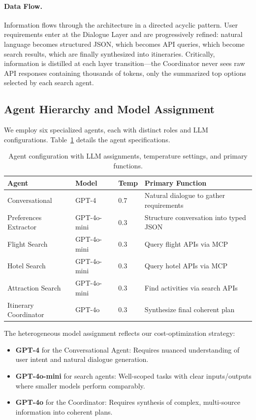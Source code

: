 \documentclass[preprint,review,12pt]{elsarticle}
\begin{document}
\paragraph{Data Flow.} Information flows through the architecture in a directed acyclic pattern. User requirements enter at the Dialogue Layer and are progressively refined: natural language becomes structured JSON, which becomes API queries, which become search results, which are finally synthesized into itineraries. Critically, information is distilled at each layer transition---the Coordinator never sees raw API responses containing thousands of tokens, only the summarized top options selected by each search agent.

\subsection{Agent Hierarchy and Model Assignment}

We employ six specialized agents, each with distinct roles and LLM configurations. Table~\ref{tab:agents} details the agent specifications.

\begin{table}[h]
\centering
\caption{Agent configuration with LLM assignments, temperature settings, and primary functions.}
\label{tab:agents}
\begin{tabular}{p{2.5cm}p{2cm}p{1cm}p{5.5cm}}
\toprule
\textbf{Agent} & \textbf{Model} & \textbf{Temp} & \textbf{Primary Function} \\
\midrule
Conversational & GPT-4 & 0.7 & Natural dialogue to gather requirements \\
Preferences Extractor & GPT-4o-mini & 0.3 & Structure conversation into typed JSON \\
Flight Search & GPT-4o-mini & 0.3 & Query flight APIs via MCP \\
Hotel Search & GPT-4o-mini & 0.3 & Query hotel APIs via MCP \\
Attraction Search & GPT-4o-mini & 0.3 & Find activities via search APIs \\
Itinerary Coordinator & GPT-4o & 0.3 & Synthesize final coherent plan \\
\bottomrule
\end{tabular}
\end{table}

The heterogeneous model assignment reflects our cost-optimization strategy:
\begin{itemize}
    \item \textbf{GPT-4} for the Conversational Agent: Requires nuanced understanding of user intent and natural dialogue generation.
    \item \textbf{GPT-4o-mini} for search agents: Well-scoped tasks with clear inputs/outputs where smaller models perform comparably.
    \item \textbf{GPT-4o} for the Coordinator: Requires synthesis of complex, multi-source information into coherent plans.
\end{itemize}
\end{document}
